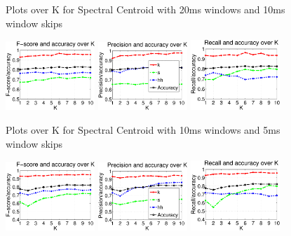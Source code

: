 {{{\begin{figure}
			\caption{Plots over K for Spectral Centroid with 20ms windows and 10ms window skips}
		\end{figure}
		\begin{figure}
			\centering\includegraphics[width=0.3\textwidth]{tex/appendices/test/scentroid105FP.png}
			\centering\includegraphics[width=0.3\textwidth]{tex/appendices/test/scentroid105_P.png}
			\centering\includegraphics[width=0.3\textwidth]{tex/appendices/test/scentroid105_R.png}
				
				\caption{Plots over K for Spectral Centroid with 10ms windows and 5ms window skips}
		\end{figure}
		\begin{figure}
			\centering\includegraphics[width=0.3\textwidth]{tex/appendices/test/scentroid52FP.png}
			\centering\includegraphics[width=0.3\textwidth]{tex/appendices/test/scentroid52_P.png}
			\centering\includegraphics[width=0.3\textwidth]{tex/appendices/test/scentroid52_R.png}
				

\end{figure}}}}
